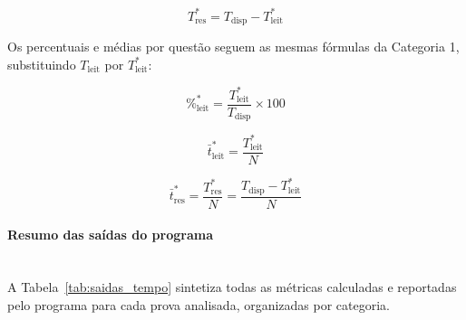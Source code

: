 \documentclass[a4paper,10pt, twocolumn]{article}
\begin{document}
\begin{equation}
T_{\text{res}}^{*} = T_{\text{disp}} - T_{\text{leit}}^{*}
\label{eq:tempo_resolucao_completo}
\end{equation}

Os percentuais e médias por questão seguem as mesmas fórmulas da Categoria 1, substituindo $T_{\text{leit}}$ por $T_{\text{leit}}^{*}$:

\begin{equation}
\%_{\text{leit}}^{*} = \frac{T_{\text{leit}}^{*}}{T_{\text{disp}}} \times 100
\label{eq:pct_leitura_completo}
\end{equation}

\begin{equation}
\bar{t}_{\text{leit}}^{*} = \frac{T_{\text{leit}}^{*}}{N}
\label{eq:leitura_media_completo}
\end{equation}

\begin{equation}
\bar{t}_{\text{res}}^{*} = \frac{T_{\text{res}}^{*}}{N} = \frac{T_{\text{disp}} - T_{\text{leit}}^{*}}{N}
\label{eq:resolucao_media_completo}
\end{equation}

\paragraph{Resumo das saídas do programa}
\mbox{}\\

A Tabela~\ref{tab:saidas_tempo} sintetiza todas as métricas calculadas e reportadas pelo programa para cada prova analisada, organizadas por categoria.
\end{document}
